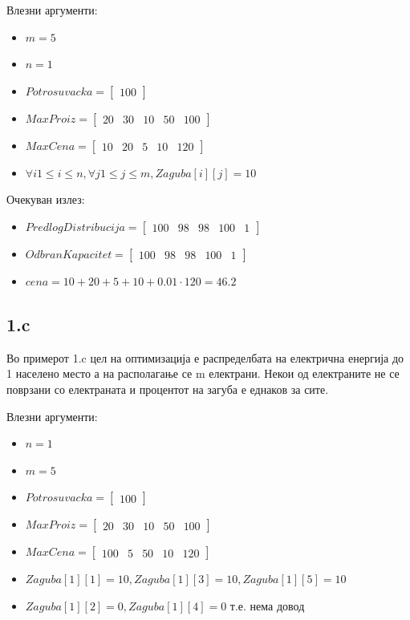 \documentclass{article}
\begin{document}
Влезни аргументи: 
\begin{itemize}
\item $m = 5$
\item $n = 1$
\item $Potrosuvacka = \begin{bmatrix} 100 \end{bmatrix}$
\item $MaxProiz = \begin{bmatrix} 20 & 30 & 10 & 50 & 100\end{bmatrix}$
\item $MaxCena = \begin{bmatrix} 10 & 20 & 5 & 10 & 120\end{bmatrix}$
\item $\forall i 1 \leq i \leq n, \forall j 1 \leq j \leq m, Zaguba[i][j] = 10$

\end{itemize}

Очекуван излез:
\begin{itemize}
\item $PredlogDistribucija = \begin{bmatrix} 100 & 98 & 98 & 100 & 1 \end{bmatrix}$
\item $OdbranKapacitet = \begin{bmatrix} 100 & 98 & 98 & 100 & 1\end{bmatrix}$
\item $cena = 10 + 20 + 5 + 10 + 0.01 \cdot 120 = 46.2 $
\end{itemize}

\subsection{1.c}

Во примерот 1.c цел на оптимизација е распределбата на електрична енергија до 1 населено место а на располагање се m електрани. Некои од електраните не се поврзани со електраната и процентот на загуба е еднаков за сите.

Влезни аргументи: 
\begin{itemize}
\item $n = 1$
\item $m = 5$
\item $Potrosuvacka = \begin{bmatrix} 100 \end{bmatrix}$
\item $MaxProiz = \begin{bmatrix} 20 & 30 & 10 & 50 & 100 \end{bmatrix}$
\item $MaxCena = \begin{bmatrix} 100 & 5 & 50 & 10 & 120 \end{bmatrix}$
\item $Zaguba[1][1] = 10, Zaguba[1][3] = 10, Zaguba[1][5] = 10$
\item $Zaguba[1][2] = 0, Zaguba[1][4] = 0$ т.е. нема довод
\end{itemize}
\end{document}
